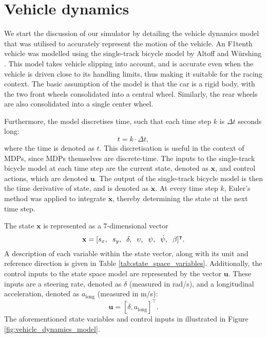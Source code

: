 \section{Vehicle dynamics}\label{sec:sim_vehicle_dynamics}

We start the discussion of our simulator by detailing the vehicle dynamics model that was utilised to accurately represent the motion of the vehicle.
An F1tenth vehicle was modelled using the single-track bicycle model by  Altoff and  W\"{u}rshing \cite{Althoff2020}.
This model takes vehicle slipping into account, and is accurate even when the vehicle is driven close to its handling limits, thus making it suitable for the racing context.
The basic assumption of the model is that the car is a rigid body, with the two front wheels consolidated into a central wheel. 
Similarly, the rear wheels are also consolidated into a single center wheel. 


Furthermore, the model discretises time, such that each time step $k$ is $\Delta t$ seconds long:
\begin{equation}
    t = k \cdot \Delta t,
\end{equation}
where the time is denoted as $t$.
This discretisation is useful in the context of MDPs, since MDPs themselves are discrete-time.
The inputs to the single-track bicycle model at each time step are the current state, denoted as $\mathbf{x}$, and control actions, which are denoted $\mathbf{u}$.
The output of the single-track bicycle model is then the time derivative of state, and is denoted as $\mathbf{\dot{x}}$.
At every time step $k$, Euler's method was applied to integrate $\mathbf{\dot{x}}$, thereby determining the state at the next time step.


The state $\mathbf{x}$ is represented as a 7-dimensional vector
\begin{equation}
    \mathbf{x} = [s_x, \hspace{0.2cm} s_y, \hspace{0.2cm} \delta, \hspace{0.2cm} \upsilon, \hspace{0.2cm} \psi, \hspace{0.2cm} \dot{\psi}, \hspace{0.2cm} \beta]^\intercal .
\end{equation}
A description of each variable within the state vector, along with its unit and reference direction is given in Table \ref{tab:state_space_variables}.
Additionally, the control inputs to the state space model are represented by the vector $\mathbf{u}$. 
These inputs are a steering rate, denoted as $\dot{\delta}$ (measured in rad/s), and a longitudinal acceleration, denoted as $a_{\text{long}}$ (measured in m/s):
\begin{equation}
    \mathbf{u} = [\dot{\delta}, a_{\text{long}}]^\intercal.
\end{equation}
The aforementioned state variables and control inputs in illustrated in Figure \ref{fig:vehicle_dynamics_model}.

